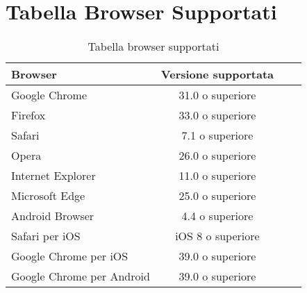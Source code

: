 \section{Tabella Browser Supportati}
\label{Tabella browser supportati}
\begin{table}[htbp]
	\begin{center}
		\setlength{\extrarowheight}{\jot}
		\begin{tabular}{|p{4cm}|c|p{2.5cm}|p{2.5cm}|}
			\hline
			\textbf{Browser} & \textbf{Versione supportata}\\[1ex]
			\hline
			Google Chrome & 31.0 o superiore \\[1ex]
			\hline
			Firefox & 33.0 o superiore\\[1ex]
			\hline
			Safari & 7.1 o superiore\\[1ex]
			\hline
			Opera & 26.0 o superiore\\[1ex]
			\hline
			Internet Explorer & 11.0 o superiore\\[1ex]
			\hline
			Microsoft Edge & 25.0 o superiore\\[1ex]
			\hline
			Android Browser & 4.4 o superiore\\[1ex]
			\hline
			Safari per iOS & iOS 8 o superiore\\[1ex]
			\hline
			Google Chrome per iOS & 39.0 o superiore\\[1ex]
			\hline
			Google Chrome per Android & 39.0 o superiore\\[1ex]
			\hline
		\end{tabular}
	\end{center}
	\caption{Tabella browser supportati}
\end{table}
